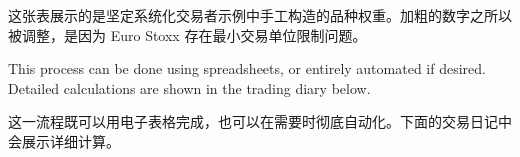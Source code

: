 \begin{chineseblock}这张表展示的是坚定系统化交易者示例中手工构造的品种权重。加粗的数字之所以被调整，是因为 Euro Stoxx 存在最小交易单位限制问题。\end{chineseblock}


\begin{englishblock} This process can be done using spreadsheets, or entirely automated if desired. Detailed calculations are shown in the trading diary below. \end{englishblock}

\begin{chineseblock}这一流程既可以用电子表格完成，也可以在需要时彻底自动化。下面的交易日记中会展示详细计算。\end{chineseblock}

